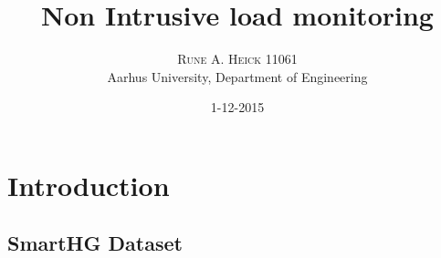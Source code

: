 


\title{\vspace{-15mm}\fontsize{24pt}{10pt}\selectfont\textbf{Non Intrusive load monitoring}} %

\author{
\large
\textsc{Rune A. Heick 11061}\\[2mm] %
\normalsize Aarhus University, Department of Engineering \\ %
\vspace{-5mm}
}
\date{1-12-2015}


\setlength{\abovedisplayskip}{1cm}
\setlength{\belowdisplayskip}{.8cm}
\maketitle %

\newpage

\begin{abstract}
\lipsum[7] %
\end{abstract}

\newpage

\tableofcontents


\chapter{Introduction}
\lipsum[1] %
\section{SmartHG Dataset}
\lipsum[3] %



 

